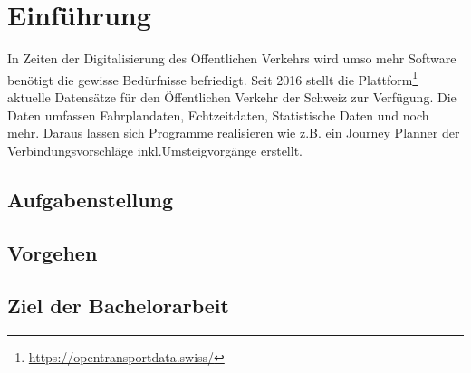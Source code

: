 \section{Einführung}
\label{sec:Einfuehrung}
In Zeiten der Digitalisierung des Öffentlichen Verkehrs wird umso mehr Software benötigt die gewisse Bedürfnisse befriedigt. Seit 2016 stellt die Plattform\footnote{\url{https://opentransportdata.swiss/}} aktuelle Datensätze für den Öffentlichen Verkehr der Schweiz zur Verfügung. Die Daten umfassen Fahrplandaten, Echtzeitdaten, Statistische Daten und noch mehr. Daraus lassen sich Programme realisieren wie z.B. ein Journey Planner der Verbindungsvorschläge inkl.Umsteigvorgänge erstellt. 

\subsection{Aufgabenstellung}
\label{Aufgabenstellung}




\subsection{Vorgehen}
\label{Vorgehen}

\subsection{Ziel der Bachelorarbeit}
\label{Ziel der Bachelorarbeit}